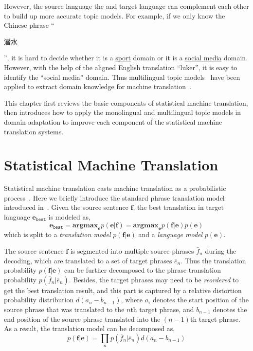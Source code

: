 However, the source language the and target language can complement each other to build up more accurate topic models. For example, if we only know the Chinese phrase ``\begin{CJK*}{UTF8}{gbsn}潜水\end{CJK*}'', it is hard to decide whether it is a \underline{sport} domain or it is a \underline{social media} domain. However, with the help of the aligned English translation ``luker'', it is easy to identify the ``social media'' domain. Thus multilingual topic models~\citep{mimno-09,boyd-graber-10} have been applied to extract domain knowledge for machine translation~\citep{hu-14}. 

This chapter first reviews the basic components of statistical machine translation, then introduces how to apply the monolingual and multilingual topic models in domain adaptation to improve each component of the statistical machine translation systems.

\section{Statistical Machine Translation}

Statistical machine translation casts machine translation as a probabilistic process~\citep{koehn-09}. Here we briefly introduce the standard phrase translation model introduced in~\citep{koehn-03}. Given the source sentence $\mathbf{f}$, the best translation in target language $\mathbf{e}_\texttt{best}$ is modeled as,
\begin{equation}
\mathbf{e}_\texttt{best} = \textbf{argmax}_\mathbf{e} p(\mathbf{e}|\mathbf{f}) = \textbf{argmax}_\mathbf{e} p(\mathbf{f}|\mathbf{e}) p (\mathbf{e})
\end{equation}
which is split to a \textit{translation model} $p(\mathbf{f}|\mathbf{e})$ and a \textit{language model} $p (\mathbf{e})$.

The source sentence $\mathbf{f}$ is segmented into multiple source phrases $\bar{f}_n$ during the decoding, which are translated to a set of target phrases $\bar{e}_n$. Thus the translation probability $p(\mathbf{f}|\mathbf{e})$ can be further decomposed to the phrase translation probability $p(\bar{f}_n | \bar{e}_n)$. Besides, the target phrases may need to be \textit{reordered} to get the best translation result, and this part is captured by a relative distortion probability distribution $d(a_n - b_{n-1})$, where $a_i$ denotes the start position of the source phrase that was translated to the $n$th target phrase, and $b_{n-1}$ denotes the end position of the source phrase translated into the $(n-1)$th target phrase. As a result, the translation model can be decomposed as,
\begin{equation}
p(\mathbf{f}|\mathbf{e}) = \prod_{n} p(\bar{f}_n | \bar{e}_n) d(a_n - b_{n-1})
\end{equation}

